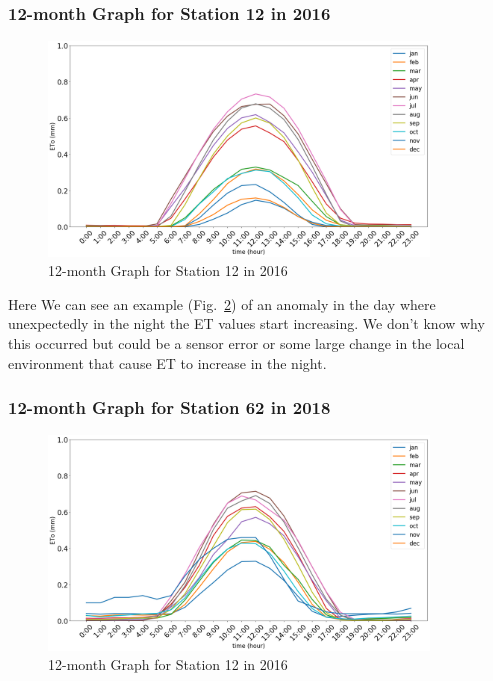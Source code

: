\begin{frame}
\frametitle{12-month Graph for Station 12 in 2016}
\centering
\begin{figure}
	\includegraphics[width=0.9\textwidth]{images/12-2016.png}
	\caption{12-month Graph for Station 12 in 2016}\label{fig:12-2016}
\end{figure}
\end{frame}

\begin{frame}
	Here We can see an example (Fig.~\ref{fig:62-2018}) of an anomaly in the day where unexpectedly in the night the ET values start increasing. We don't know why this occurred but could be a sensor error or some large change in the local environment that cause ET to increase in the night.
\end{frame}

\begin{frame}
\frametitle{12-month Graph for Station 62 in 2018}
\centering
\begin{figure}
	\includegraphics[width=0.9\textwidth]{images/62-2018.png}
	\caption{12-month Graph for Station 12 in 2016}\label{fig:62-2018}
\end{figure}
\end{frame}


